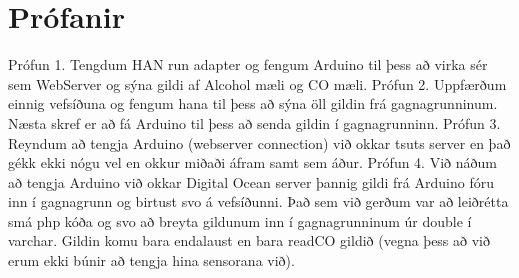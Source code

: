 \section{Prófanir}
Prófun 1. Tengdum HAN run adapter og fengum Arduino til þess að virka sér sem WebServer og sýna gildi af Alcohol mæli og CO mæli. 
Prófun 2. Uppfærðum einnig vefsíðuna og fengum hana til þess að sýna öll gildin frá gagnagrunninum. Næsta skref er að fá Arduino til þess að senda gildin í gagnagrunninn.
Prófun 3. Reyndum að tengja Arduino (webserver connection) við okkar tsuts server en það gékk ekki nógu vel en okkur miðaði áfram samt sem áður. 
Prófun 4. Við náðum að tengja Arduino við okkar Digital Ocean server þannig gildi frá Arduino fóru inn í gagnagrunn og birtust svo á vefsíðunni. Það sem við gerðum var að leiðrétta smá php kóða og svo að breyta gildunum inn í gagnagrunninum úr double í varchar. Gildin komu bara endalaust en bara readCO gildið (vegna þess að við erum ekki búnir að tengja hina sensorana við). 
   


